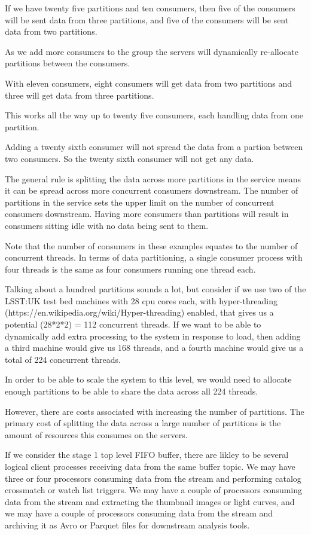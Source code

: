 \documentclass{article}
\newcommand{\crossmatch} {crossmatch\xspace}
\begin{document}
If we have twenty five partitions and ten consumers, then five of the consumers will be sent
data from three partitions, and five of the consumers will be sent data from two partitions.

As we add more consumers to the group the servers will dynamically re-allocate
partitions between the consumers.

With eleven consumers, eight consumers will get data from two partitions and
three will get data from three partitions.

This works all the way up to twenty five consumers, each handling data from one partition.

Adding a twenty sixth consumer will not spread the data from a partion between two
consumers. So the twenty sixth consumer will not get any data.

The general rule is splitting the data across more partitions in the service means it can be spread
across more concurrent consumers downstream.
The number of partitions in the service sets the upper limit on the number of concurrent
consumers downstream.
Having more consumers than partitions will result in consumers sitting idle with no data being sent to them.

Note that the number of consumers in these examples equates to the number of concurrent threads.
In terms of data partitioning, a single consumer process with four threads is the same as
four consumers running one thread each.

Talking about a hundred partitions sounds a lot, but consider if we use two of the LSST:UK test bed machines
with 28 cpu cores each, with hyper-threading (https://en.wikipedia.org/wiki/Hyper-threading) enabled,
that gives us a potential (28*2*2) = 112 concurrent threads.
If we want to be able to dynamically add extra processing to the system in response to load, then
adding a third machine would give us 168 threads, and a fourth machine would give us a total of 224
concurrent threads.

In order to be able to scale the system to this level, we would need to allocate enough partitions
to be able to share the data across all 224 threads.

However, there are costs associated with increasing the number of partitions.
The primary cost of splitting the data across a large number of partitions is the amount of resources this consumes on the servers.

If we consider the stage 1 top level FIFO buffer, there are likley to be several logical client processes
receiving data from the same buffer topic.
We may have three or four processors consuming data from the stream and performing catalog \crossmatch or
watch list triggers.
We may have a couple of processors consuming data from the stream and extracting the thumbnail images or light curves, and we may have a couple of processors consuming data from the stream and archiving it as Avro or Parquet files for downstream analysis tools.
\end{document}
